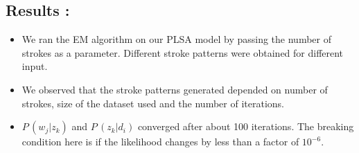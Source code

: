 \documentclass[10pt]{article}
\begin{document}
		\subsection{Results :}
			\begin{itemize}
				\item
				We ran the EM algorithm on our PLSA model by passing the number of strokes as a parameter. Different stroke patterns were obtained for different input.
				\item
				We observed that the stroke patterns generated depended on number of strokes, size of the dataset used and the number of iterations.
				\item
				$P\,(w_j|z_k)$ and $P\,(z_k|d_i)$ converged after about 100 iterations.
				The breaking condition here is if the likelihood changes by less than a factor of $10^{-6}$.
			\end{itemize}
\end{document}
